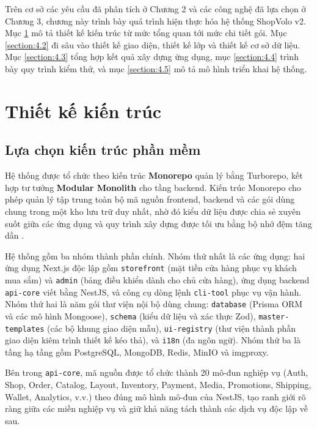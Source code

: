 \documentclass[../main.tex]{subfiles}
\begin{document}
Trên cơ sở các yêu cầu đã phân tích ở Chương 2 và các công nghệ đã lựa chọn ở Chương 3, chương này trình bày quá trình hiện thực hóa hệ thống ShopVolo v2. Mục \ref{section:4.1} mô tả thiết kế kiến trúc từ mức tổng quan tới mức chi tiết gói. Mục \ref{section:4.2} đi sâu vào thiết kế giao diện, thiết kế lớp và thiết kế cơ sở dữ liệu. Mục \ref{section:4.3} tổng hợp kết quả xây dựng ứng dụng, mục \ref{section:4.4} trình bày quy trình kiểm thử, và mục \ref{section:4.5} mô tả mô hình triển khai hệ thống.

\section{Thiết kế kiến trúc}
\label{section:4.1}

\subsection{Lựa chọn kiến trúc phần mềm}
\label{subsection:4.1.1}

Hệ thống được tổ chức theo kiến trúc \textbf{Monorepo} quản lý bằng Turborepo, kết hợp tư tưởng \textbf{Modular Monolith} cho tầng backend. Kiến trúc Monorepo cho phép quản lý tập trung toàn bộ mã nguồn frontend, backend và các gói dùng chung trong một kho lưu trữ duy nhất, nhờ đó kiểu dữ liệu được chia sẻ xuyên suốt giữa các ứng dụng và quy trình xây dựng được tối ưu bằng bộ nhớ đệm tăng dần \cite{turborepo_docs}.

Hệ thống gồm ba nhóm thành phần chính. Nhóm thứ nhất là các ứng dụng: hai ứng dụng Next.js độc lập gồm \texttt{storefront} (mặt tiền cửa hàng phục vụ khách mua sắm) và \texttt{admin} (bảng điều khiển dành cho chủ cửa hàng), ứng dụng backend \texttt{api-core} viết bằng NestJS, và công cụ dòng lệnh \texttt{cli-tool} phục vụ vận hành. Nhóm thứ hai là năm gói thư viện nội bộ dùng chung: \texttt{database} (Prisma ORM và các mô hình Mongoose), \texttt{schema} (kiểu dữ liệu và xác thực Zod), \texttt{master-templates} (các bộ khung giao diện mẫu), \texttt{ui-registry} (thư viện thành phần giao diện kiêm trình thiết kế kéo thả), và \texttt{i18n} (đa ngôn ngữ). Nhóm thứ ba là tầng hạ tầng gồm PostgreSQL, MongoDB, Redis, MinIO và imgproxy.

Bên trong \texttt{api-core}, mã nguồn được tổ chức thành 20 mô-đun nghiệp vụ (Auth, Shop, Order, Catalog, Layout, Inventory, Payment, Media, Promotions, Shipping, Wallet, Analytics, v.v.) theo đúng mô hình mô-đun của NestJS, tạo ranh giới rõ ràng giữa các miền nghiệp vụ và giữ khả năng tách thành các dịch vụ độc lập về sau.
\end{document}
